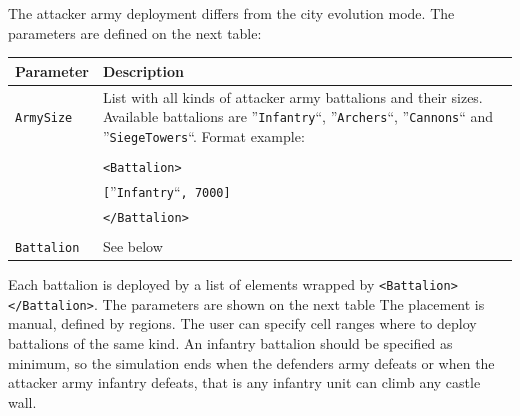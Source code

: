 \documentclass[tog]{acmsiggraph}
\begin{document}
The attacker army deployment differs from the city evolution mode. 
The parameters are defined on the next table: 

\begin{tabularx}{0.48\textwidth}{ |l|X| }
\hline 
\textbf{Parameter} & \textbf{Description} \\[0.15cm]
 \hline
 \texttt{ArmySize} & List with all kinds of attacker army battalions and their sizes. Available battalions are ''\texttt{Infantry}``, ''\texttt{Archers}``, ''\texttt{Cannons}`` and ''\texttt{SiegeTowers}``. Format example:  \\
 & \\
 & \quad\texttt{<Battalion>} \\
 & \quad\quad \texttt{[}''\texttt{Infantry}``\texttt{, 7000]} \\
 & \quad\texttt{</Battalion>} \\
 & \\
 \hline
 \texttt{Battalion} & See below \\
 \hline
\end{tabularx} 

Each battalion is deployed by a list of elements wrapped by \texttt{<Battalion></Battalion>}. The parameters are shown on the next table
The placement is manual, defined by regions. 
The user can specify cell ranges where to deploy battalions of the same kind.
An infantry battalion should be specified as minimum, so the simulation ends when the defenders army defeats or when the attacker army infantry defeats, that is any infantry unit can climb any castle wall.
\end{document}
